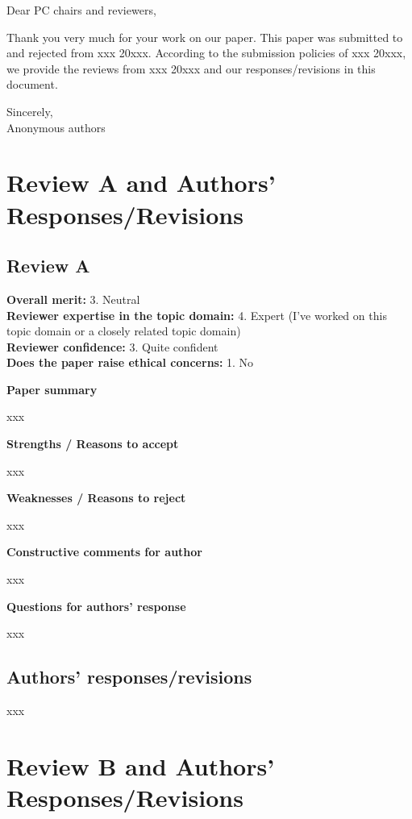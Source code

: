 \documentclass{article}
\begin{document}
\noindent Dear PC chairs and reviewers,

Thank you very much for your work on our paper.
This paper was submitted to and rejected from xxx 20xxx.
According to the submission policies of xxx 20xxx, we provide the reviews from xxx 20xxx and our responses/revisions in this document.

\rule{0pt}{8pt}

\noindent Sincerely,\\
Anonymous authors

\section{Review A and Authors' Responses/Revisions}
\subsection{Review A}
\textbf{Overall merit:} 3. Neutral\\
\textbf{Reviewer expertise in the topic domain:} 4. Expert (I've worked on this topic domain or a closely related topic domain)\\
\textbf{Reviewer confidence:} 3. Quite confident\\
\textbf{Does the paper raise ethical concerns:} 1. No

\rule{0pt}{8pt}

\noindent\textbf{Paper summary}

xxx

\rule{0pt}{8pt}

\noindent\textbf{Strengths / Reasons to accept}

xxx

\rule{0pt}{8pt}

\noindent\textbf{Weaknesses / Reasons to reject}

xxx

\rule{0pt}{8pt}

\noindent\textbf{Constructive comments for author}

xxx

\rule{0pt}{8pt}

\noindent\textbf{Questions for authors’ response}

xxx

\subsection{Authors' responses/revisions}
xxx

\section{Review B and Authors' Responses/Revisions}
\end{document}
